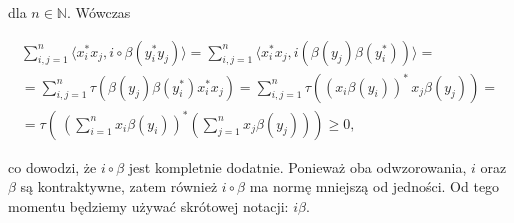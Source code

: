 dla $n \in \mathbb{N}$.
Wówczas
\begin{linenomath*}
 \begin{multline}
\sum \limits_{i, j =1}^{n}
\langle x_{i}^{*} x_{j}, i \circ \beta(y_{i}^{*} y_{j}) \rangle =
\sum \limits_{i, j =1}^{n}
\langle x_{i}^{*} x_{j}, i ( \beta( y_{j}) \beta(y_{i}^{*})) \rangle = \\
=\sum \limits_{i, j =1}^{n}
\tau \left(\beta( y_{j}) \beta(y_{i}^{*}) x_{i}^{*} x_{j}\right) =
\sum \limits_{i, j =1}^{n} \tau \left( (x_{i} \beta(y_{i}) )^{*} \,  x_{j} \beta( y_{j})
\right) =\\
= \tau \left( \
\left( \sum \limits_{i=1}^{n} x_{i} \beta(y_{i}) \right)^{*}
\left( \sum \limits_{j=1}^{n} x_{j} \beta(y_{j}) \right)\right ) \geq 0,
 \end{multline}
\end{linenomath*}
co dowodzi, że $i \circ \beta$ jest kompletnie dodatnie.
Ponieważ oba odwzorowania, $i$ oraz $\beta$ są kontraktywne,
zatem również $i\circ\beta$ ma normę mniejszą od jedności.
Od tego momentu będziemy używać skrótowej notacji: $i\beta$.

